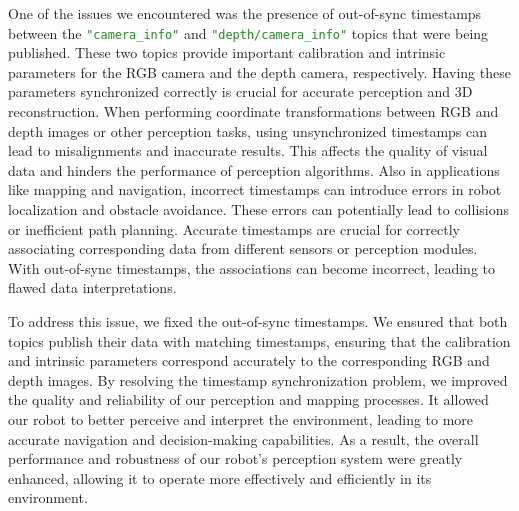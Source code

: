 One of the issues we encountered was the presence of out-of-sync timestamps between the \textcolor{ForestGreen}{\texttt{"camera\_info"}} and \textcolor{ForestGreen}{\texttt{"depth/camera\_info"}} topics that were being published. These two topics provide important calibration and intrinsic parameters for the RGB camera and the depth camera, respectively. Having these parameters synchronized correctly is crucial for accurate perception and 3D reconstruction.
When performing coordinate transformations between RGB and depth images or other perception tasks, using unsynchronized timestamps can lead to misalignments and inaccurate results. This affects the quality of visual data and hinders the performance of perception algorithms. Also in applications like mapping and navigation, incorrect timestamps can introduce errors in robot localization and obstacle avoidance. These errors can potentially lead to collisions or inefficient path planning. Accurate timestamps are crucial for correctly associating corresponding data from different sensors or perception modules. With out-of-sync timestamps, the associations can become incorrect, leading to flawed data interpretations.

To address this issue, we fixed the out-of-sync timestamps. We ensured that both topics publish their data with matching timestamps, ensuring that the calibration and intrinsic parameters correspond accurately to the corresponding RGB and depth images.
By resolving the timestamp synchronization problem, we improved the quality and reliability of our perception and mapping processes. It allowed our robot to better perceive and interpret the environment, leading to more accurate navigation and decision-making capabilities. As a result, the overall performance and robustness of our robot's perception system were greatly enhanced, allowing it to operate more effectively and efficiently in its environment.
